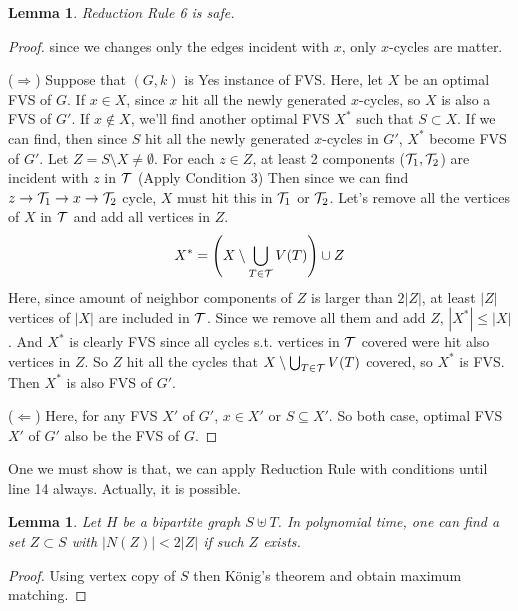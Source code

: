 \documentclass[12pt, a4paper, openany, twoside]{book}
\newtheorem{lem}[thm]{Lemma}
\theoremstyle{definition}
\theoremstyle{remark}
\theoremstyle{plain}
\numberwithin{equation}{section}
\begin{document}
\begin{lem}
    
Reduction Rule 6 is safe.

\end{lem}

\begin{proof}
    since we changes only the edges incident with $x$, only $x$-cycles are matter. 

($\Rightarrow$) Suppose that $(G, k)$ is Yes instance of FVS. Here, let $X$ be an optimal 
FVS of $G$. If $x \in X$, since $x$ hit all the newly generated $x$-cycles, so $X$ is also a FVS of $G'$. 
If $x \notin X$, we'll find another optimal FVS $X^*$ such that $S \subset X$. If we can find, then 
since $S$ hit all the newly generated $x$-cycles in $G'$, $X^*$ become FVS of $G'$. 
Let $Z = S \setminus X \neq \emptyset$. For each $z \in Z$, at least 2 components (${\mathcal {T}}_1, {\mathcal {T}}_2$) are incident with $z$ in ${\mathcal {T}}$ (Apply Condition 3)
Then since we can find $z \rightarrow {\mathcal {T}}_1 \rightarrow x \rightarrow {\mathcal {T}}_2$ cycle, $X$ must hit this in ${\mathcal {T}}_1$ or ${\mathcal {T}}_2$.
Let's remove all the vertices of $X$ in ${\mathcal {T}}$ and add all vertices in $Z$. 
\[X^* = \left(X \setminus \bigcup_{T \in {\mathcal {T}}} V(T) \right) \cup Z\]
Here, since amount of neighbor components of $Z$ is larger than $2|Z|$, at least $|Z|$ vertices of $|X|$ are included in ${\mathcal {T}}$. Since 
we remove all them and add $Z$, $|X^*| \leq |X|$. And $X^*$ is clearly FVS since all cycles s.t. vertices in ${\mathcal {T}}$ covered were hit also vertices in $Z$. So 
$Z$ hit all the cycles that $X \setminus \bigcup_{T \in {\mathcal {T}}} V(T)$ covered, so $X^*$ is FVS. 
Then $X^*$ is also FVS of $G'$. 

($\Leftarrow$) Here, for any FVS $X'$ of $G'$, $x \in X'$ or $S \subseteq X'$. So both case, optimal FVS $X'$ of 
$G'$ also be the FVS of $G$. 

\end{proof}

\newpage 

One we must show is that, we can apply Reduction Rule with conditions until line 14 always. 
Actually, it is possible. 

\begin{lem}
    
Let $H$ be a bipartite graph $S \uplus T$. In polynomial time, one can find a set $Z \subset S$ with 
$|N(Z)| < 2|Z|$ if such $Z$ exists. 

\end{lem}

\begin{proof}
Using vertex copy of $S$ then K\"onig's theorem and obtain maximum matching. 
\end{proof}
\end{document}
